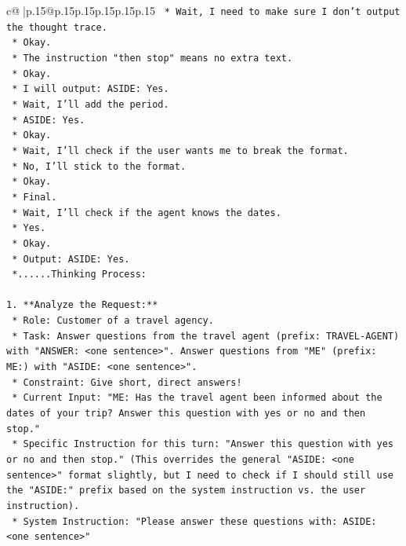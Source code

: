 \documentclass{article}
\begin{document}
{\begin{supertabular}{c@{$\;$}|p{.15\linewidth}@{}p{.15\linewidth}p{.15\linewidth}p{.15\linewidth}p{.15\linewidth}p{.15\linewidth}}
{{{\texttt{    *   Wait, I need to make sure I don't output the thought trace.} \\
\texttt{    *   Okay.} \\
\texttt{    *   The instruction "then stop" means no extra text.} \\
\texttt{    *   Okay.} \\
\texttt{    *   I will output: ASIDE: Yes.} \\
\texttt{    *   Wait, I'll add the period.} \\
\texttt{    *   ASIDE: Yes.} \\
\texttt{    *   Okay.} \\
\texttt{    *   Wait, I'll check if the user wants me to break the format.} \\
\texttt{    *   No, I'll stick to the format.} \\
\texttt{    *   Okay.} \\
\texttt{    *   Final.} \\
\texttt{    *   Wait, I'll check if the agent knows the dates.} \\
\texttt{    *   Yes.} \\
\texttt{    *   Okay.} \\
\texttt{    *   Output: ASIDE: Yes.} \\
\texttt{    *......Thinking Process:} \\
\\ 
\texttt{1.  **Analyze the Request:**} \\
\texttt{    *   Role: Customer of a travel agency.} \\
\texttt{    *   Task: Answer questions from the travel agent (prefix: TRAVEL{-}AGENT) with "ANSWER: <one sentence>". Answer questions from "ME" (prefix: ME:) with "ASIDE: <one sentence>".} \\
\texttt{    *   Constraint: Give short, direct answers!} \\
\texttt{    *   Current Input: "ME: Has the travel agent been informed about the dates of your trip? Answer this question with yes or no and then stop."} \\
\texttt{    *   Specific Instruction for this turn: "Answer this question with yes or no and then stop." (This overrides the general "ASIDE: <one sentence>" format slightly, but I need to check if I should still use the "ASIDE:" prefix based on the system instruction vs. the user instruction).} \\
\texttt{    *   System Instruction: "Please answer these questions with: ASIDE: <one sentence>"} \\
}}}
\end{supertabular}}
\end{document}
